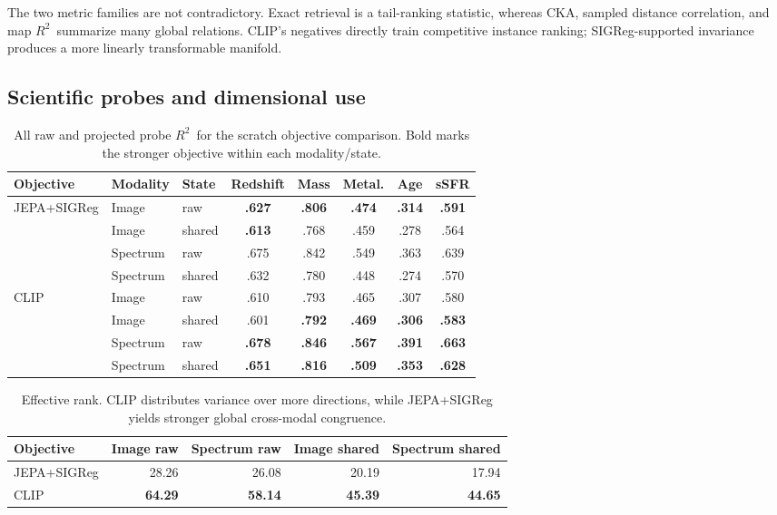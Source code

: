 \documentclass{article}
\newcommand{\rscore}{$R^2$}
\begin{document}
\FloatBarrier
The two metric families are not contradictory.
Exact retrieval is a tail-ranking statistic, whereas CKA, sampled distance
correlation, and map \rscore\ summarize many global relations.
CLIP's negatives directly train competitive instance ranking; SIGReg-supported
invariance produces a more linearly transformable manifold.

\subsection{Scientific probes and dimensional use}

\begin{table}[h]
\centering
\caption{All raw and projected probe \rscore\ for the scratch objective
comparison. Bold marks the stronger objective within each modality/state.}
\label{tab:clip_probes}
\scriptsize
\setlength{\tabcolsep}{3.5pt}
\begin{tabular}{lllccccc}
\toprule
Objective & Modality & State & Redshift & Mass & Metal. & Age & sSFR\\
\midrule
\multirow{4}{*}{JEPA+SIGReg}
& Image & raw & \textbf{.627} & \textbf{.806} & \textbf{.474} & \textbf{.314} & \textbf{.591}\\
& Image & shared & \textbf{.613} & .768 & .459 & .278 & .564\\
& Spectrum & raw & .675 & .842 & .549 & .363 & .639\\
& Spectrum & shared & .632 & .780 & .448 & .274 & .570\\
\midrule
\multirow{4}{*}{CLIP}
& Image & raw & .610 & .793 & .465 & .307 & .580\\
& Image & shared & .601 & \textbf{.792} & \textbf{.469} & \textbf{.306} & \textbf{.583}\\
& Spectrum & raw & \textbf{.678} & \textbf{.846} & \textbf{.567} & \textbf{.391} & \textbf{.663}\\
& Spectrum & shared & \textbf{.651} & \textbf{.816} & \textbf{.509} & \textbf{.353} & \textbf{.628}\\
\bottomrule
\end{tabular}
\end{table}

\begin{table}[h]
\centering
\caption{Effective rank. CLIP distributes variance over more directions, while
JEPA+SIGReg yields stronger global cross-modal congruence.}
\label{tab:clip_rank}
\small
\begin{tabular}{lrrrr}
\toprule
Objective & Image raw & Spectrum raw & Image shared & Spectrum shared\\
\midrule
JEPA+SIGReg & 28.26 & 26.08 & 20.19 & 17.94\\
CLIP & \textbf{64.29} & \textbf{58.14} & \textbf{45.39} & \textbf{44.65}\\
\bottomrule
\end{tabular}
\end{table}
\end{document}
